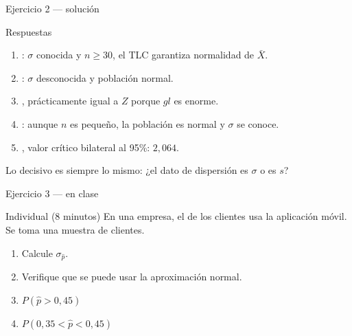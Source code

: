 \documentclass[aspectratio=169,10pt]{beamer}
\begin{document}
\begin{frame}{Ejercicio 2 — solución}
  \small
  \begin{block}{Respuestas}
    \footnotesize
    \begin{enumerate}
      \item {}: $\sigma$ conocida y $n\ge 30$, el TLC garantiza
            normalidad de $\bar{X}$.
      \item {}: $\sigma$ desconocida y población normal.
      \item {}, prácticamente igual a $Z$ porque
            $gl$ es enorme.
      \item {}: aunque $n$ es pequeño, la población es normal y
            $\sigma$ se conoce.
      \item {}, valor crítico bilateral al 95\%:
            $2{,}064$.
    \end{enumerate}
  \end{block}

  \vspace{0.1cm}
  {\footnotesize\color{uniGris} Lo decisivo es siempre lo mismo: ¿el dato de
  dispersión es $\sigma$ o es $s$?}
\end{frame}

\begin{frame}{Ejercicio 3 — en clase}
  \begin{alertblock}{Individual (8 minutos)}
    En una empresa, el  de los clientes usa la aplicación
    móvil. Se toma una muestra de  clientes.

    \vspace{0.25cm}
    \begin{enumerate}
      \item Calcule $\sigma_{\hat p}$.
      \item Verifique que se puede usar la aproximación normal.
      \item $P(\hat{p}>0{,}45)$
      \item $P(0{,}35<\hat{p}<0{,}45)$
    \end{enumerate}
  \end{alertblock}
\end{frame}
\end{document}
